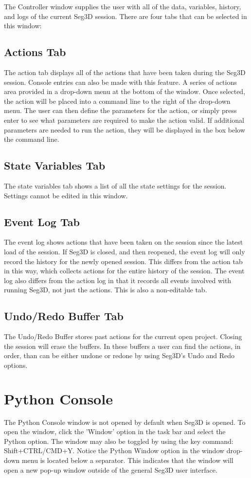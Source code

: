 \documentclass[fleqn,11pt,openany]{book}
\begin{document}
The Controller window supplies the user with all of the data, variables, history, and logs of the current Seg3D session.
There are four tabs that can be selected in this window:

\subsection{Actions Tab}
The action tab displays all of the actions that have been taken during the Seg3D session.
Console entries can also be made with this feature.
A series of actions area provided in a drop-down menu at the bottom of the window.
Once selected, the action will be placed into a command line to the right of the drop-down menu.
The user can then define the parameters for the action, or simply press enter to see what parameters are required to make the action valid.
If additional parameters are needed to run the action, they will be displayed in the box below the command line.

\subsection{State Variables Tab}
The state variables tab  shows a list of all the state settings for the session.
Settings cannot be edited in this window.

\subsection{Event Log Tab}
The event log shows actions that have been taken on the session since the latest load of the session.
If Seg3D is closed, and then reopened, the event log will only record the history for the newly opened session.
This differs from the action tab in this way, which collects actions for the entire history of the session.
The event log also differs from the action log in that it records all events involved with running Seg3D, not just the actions.
This is also a non-editable tab.

\subsection{Undo/Redo Buffer Tab}
The Undo/Redo Buffer stores past actions for the current open project.
Closing the session will erase the buffers.
In these buffers a user can find the actions, in order, than can be either undone or redone by using Seg3D's Undo and Redo options.


\section{Python Console}
The Python Console window is not opened by default when Seg3D is opened.
To open the window, click the 'Window' option in the task bar and select the Python option.
The window may also be toggled by using the key command: Shift+CTRL/CMD+Y.
Notice the Python Window option in the window drop-down menu is located below a separator.  
This indicates that the window will open a new pop-up window outside of the general Seg3D user interface.
\end{document}
